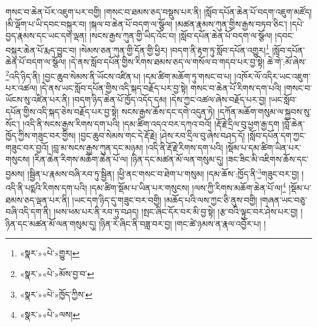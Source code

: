 གསང་བ་ཆེན་པོར་འཇུག་པར་བགྱི། །གསང་བ་ཐམས་ཅད་བསྡུས་པར་ནི། །སློབ་དཔོན་ཆེན་པོ་བདག་འཇུག་མཛོད། །མི་ལྡོག་པ་ཡི་དབང་བསྐུར་བ། །སྐལ་བ་ཆེན་པོ་བདག་ལ་སྩོལ། །མཚན་རྣམས་ཀུན་གྱིས་རྒྱས་བཏབ་ཅིང་། །དཔེ་བྱད་རྣམས་དང་ཡང་དག་ལྡན། །སངས་རྒྱས་ཀུན་གྱི་ཡིད་འོང་བ། །སློབ་དཔོན་ཆེན་པོ་བདག་ལ་སྩོལ། །དབང་བསྐུར་ཆེན་པོ་རྨད་བྱུང་བ། །སེམས་ཅན་ཀུན་གྱི་དོན་གྱི་ཕྱིར། །བདག་ནི་རྟག་ཏུ་སློབ་དཔོན་འགྱུར།\footnote{«སྣར་»«པེ་»གྱུར།} །སློབ་དཔོན་ཆེན་པོ་བདག་ལ་སྩོལ། །དེ་ནས་སློབ་དཔོན་གྱིས་རིགས་ཐམས་ཅད་ལ་གསོལ་བ་གདབ་པར་བྱ་སྟེ། ཆེ་གེ་:མོ་ཞེས་\footnote{«སྣར་»«པེ་»མོས་བྱ་བ་}འདི་ཉིད་ནི། །བྱང་ཆུབ་སེམས་ནི་ཡོངས་འཛིན་པ། །དམ་ཚིག་མཆོག་ཏུ་གསང་བ་པ། །འཁོར་ལོ་འདིར་ཡང་འཇུག་པར་འཚལ། །དེ་ནས་ཡང་སློབ་དཔོན་གྱིས་འདི་སྐད་བརྗོད་པར་བྱ་སྟེ། གསང་བ་ཆེན་པོ་རིགས་དག་པའི། །གསང་བ་ཡོངས་སུ་འཛིན་པར་ནི། །བདག་ཉིད་ཆེན་པོ་ཁྱོད་འདོད་དམ། །དེས་ཀྱང་འཚལ་ཞེས་བརྗོད་པར་བྱ། །ཡང་སློབ་དཔོན་གྱིས་འདི་སྐད་ཅེས་བརྗོད་པར་བྱ་སྟེ། སངས་རྒྱས་ཆོས་དང་དགེ་འདུན་ཏེ། །དཀོན་མཆོག་གསུམ་ལ་སྐྱབས་སུ་སོང་། །འདི་ནི་སངས་རྒྱས་རིགས་དག་པའི། །དམ་ཚིག་འདའ་བར་དཀའ་བའོ། །རྡོ་རྗེ་དྲིལ་བུ་ཕྱག་རྒྱ་དག །བློ་ཆེན་ཁྱོད་ཀྱིས་གཟུང་བར་གྱིས། །བྱང་ཆུབ་སེམས་གང་དེ་རྡོ་རྗེ། །ཤེས་རབ་དྲིལ་བུ་ཞེས་བཤད་དོ། །སློབ་དཔོན་དག་ཀྱང་གཟུང་བར་བྱའོ། །བླ་མ་སངས་རྒྱས་ཀུན་དང་མཉམ། །འདི་ནི་རྡོ་རྗེ་རིགས་དག་པའི། །སྡོམ་པ་དམ་ཚིག་ཡིན་པར་གསུངས། །རིན་ཆེན་རིགས་མཆོག་ཆེན་པོ་ལ། །ཉིན་དང་མཚན་མོ་ལན་གསུམ་དུ། །ཟང་ཟིང་མི་འཇིགས་ཆོས་དང་བྱམས། །སྦྱིན་པ་རྣམས་བཞི་རབ་ཏུ་སྦྱིན། །ཕྱི་ནང་གསང་བ་ཐེག་པ་གསུམ། །དམ་ཆོས་:ཁྱོད་ནི་\footnote{«སྣར་»«པེ་»ཁྱོད་ཀྱིས་}གཟུང་བར་བྱ། །འདི་ནི་པདྨའི་རིགས་དག་པའི། །དམ་ཚིག་སྡོམ་པ་ཡིན་པར་གསུངས། །ལས་ཀྱི་རིགས་མཆོག་ཆེན་པོ་ལ།\footnote{«སྣར་»«པེ་»ལས།} །སྡོམ་པ་ཐམས་ཅད་ལྡན་པར་ནི། །ཡང་དག་ཉིད་དུ་གཟུང་བར་བགྱི། །མཆོད་པའི་ལས་ཀྱང་ཅི་ནུས་བགྱི། །གཞན་ཡང་བཅུ་བཞི་འདི་དག་ནི། །ཕས་ཕམ་པར་ནི་རབ་ཏུ་བཤད། །སྤང་ཞིང་དོར་བར་མི་བྱ་སྟེ། །རྩ་བའི་ལྟུང་བར་ཤེས་པར་བྱ། །ཉིན་དང་མཚན་མོ་ལན་གསུམ་དུ། །ཉིན་རེ་ཞིང་ནི་བཟླ་བར་བྱ། །གང་ཚེ་ཉམས་ན་རྣལ་འབྱོར་པ། །

